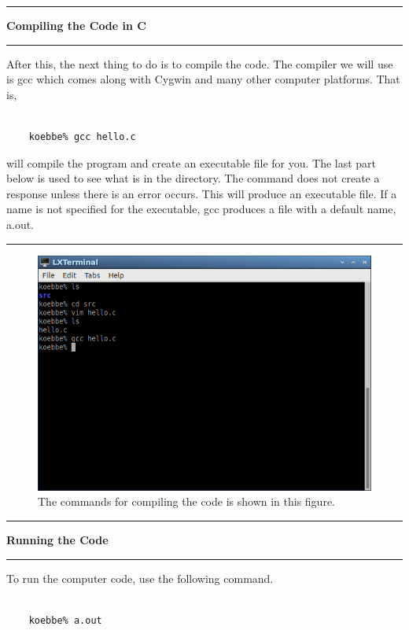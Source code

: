 \documentclass[10pt,fleqn]{article}
\begin{document}
\eject
\vskip0.1in\hrule\vskip0.1in
{\bf Compiling the Code in C} 
\vskip0.1in\hrule\vskip0.1in \noindent
\noindent
After this, the next thing to do is to compile the code. The compiler we will
use is gcc which comes along with Cygwin and many other computer platforms.
That is,
\begin{verbatim}

    koebbe% gcc hello.c

\end{verbatim}
will compile the program and create an executable file for you. The last part
below is used to see what is in the directory. The command does not create a
response unless there is an error occurs. This will produce an executable file. If a name is not specified for the executable, gcc produces a file with a
default name, a.out.
\vskip0.1in\hrule\vskip0.1in
\vfill
\begin{figure}[h]
\centering
\includegraphics[width=5.0in]{../images/hello_world_07.png}
\caption{The commands for compiling the code is shown in this figure.}
\end{figure}
\eject
\vskip0.1in\hrule\vskip0.1in \noindent
{\bf Running the Code} 
\vskip0.1in\hrule\vskip0.1in \noindent
To run the computer code, use the following command.
\begin{verbatim}

    koebbe% a.out

\end{verbatim}
\end{document}
